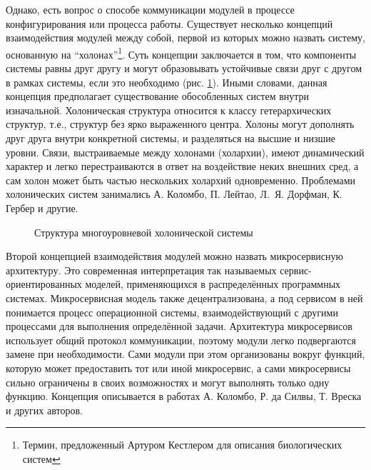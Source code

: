Однако, есть вопрос о способе коммуникации модулей в процессе конфигурирования или процесса работы. Существует несколько концепций взаимодействия модулей между собой, первой из которых можно назвать систему, основанную на ``холонах''\footnote{Термин, предложенный Артуром Кестлером для описания биологических систем}. Суть концепции заключается в том, что компоненты системы равны друг другу и могут образовывать устойчивые связи друг с другом в рамках системы, если это необходимо (рис. \cref{fig:holonic-struc}). Иными словами, данная концепция предполагает существование обособленных систем внутри изначальной. Холоническая структура относится к классу гетерархических структур, т.е., структур без ярко выраженного центра. Холоны могут дополнять друг друга внутри конкретной системы, и разделяться на высшие и низшие уровни. Связи, выстраиваемые между холонами (холархии), имеют динамический характер и легко перестраиваются в ответ на воздействие неких внешних сред, а сам холон может быть частью нескольких холархий одновременно. Проблемами холонических систем занимались А. Коломбо, П. Лейтао, Л.~Я. Дорфман, К. Гербер и другие.

\begin{figure}[h]
	\caption{Структура многоуровневой холонической системы}\label{fig:holonic-struc}
\end{figure}

Второй концепцией взаимодействия модулей можно назвать микросервисную архитектуру. Это современная интерпретация так называемых сервис-ориентированных моделей, применяющихся в распределённых программных системах. Микросервисная модель также децентрализована, а под сервисом в ней понимается процесс операционной системы, взаимодействующий с другими процессами для выполнения определённой задачи. Архитектура микросервисов использует общий протокол коммуникации, поэтому модули легко подвергаются замене при необходимости. Сами модули при этом организованы вокруг функций, которую может предоставить тот или иной микросервис, а сами микросервисы сильно ограничены в своих возможностях и могут выполнять только одну функцию. Концепция описывается в работах А. Коломбо, Р. да Силвы, Т. Вреска и других авторов.

